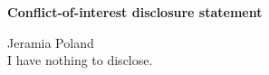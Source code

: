 \begin{center}
	\textbf{Conflict-of-interest disclosure statement}
\end{center}
\bigskip
Jeramia Poland\\
I have nothing to disclose.